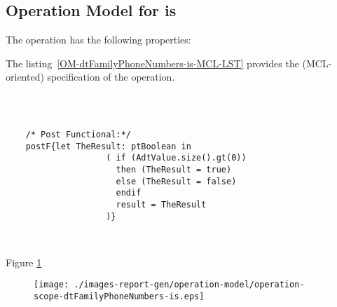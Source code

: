 \subsection{Operation Model for is}

\label{OM-is}


The  operation has the following properties:

	\begin{operationmodel}



		


	\end{operationmodel}



	\vspace{1cm}
	The listing~\ref{OM-dtFamilyPhoneNumbers-is-MCL-LST} provides the \msrmessir (MCL-oriented) specification of the operation.
	
	\scriptsize
	\vspace{0.5cm}
	\begin{lstlisting}[style=MessirStyle,firstnumber=auto,captionpos=b,caption={\msrmessir (MCL-oriented) specification of the operation \emph{is}.},label=OM-dtFamilyPhoneNumbers-is-MCL-LST]

	
	
	/* Post Functional:*/ 
	postF{let TheResult: ptBoolean in
				    ( if (AdtValue.size().gt(0))
				      then (TheResult = true)
				      else (TheResult = false)
				      endif
				      result = TheResult
				    )}
	
	
	\end{lstlisting}
	\normalsize 
	
	
	
	





Figure \ref{fig:lu.uni.lassy.excalibur.examples.icrash-OM-scopeView-operation-scope-dtFamilyPhoneNumbers-is}

\begin{figure}[htbp]
\begin{center}

\texttt{[image: ./images-report-gen/operation-model/operation-scope-dtFamilyPhoneNumbers-is.eps]}
\end{center}
\caption[lu.uni.lassy.excalibur.examples.icrash Operation Scope: operation-scope-dtFamilyPhoneNumbers-is]{}
\label{fig:lu.uni.lassy.excalibur.examples.icrash-OM-scopeView-operation-scope-dtFamilyPhoneNumbers-is}
\end{figure}
\vspace{0.5cm}

